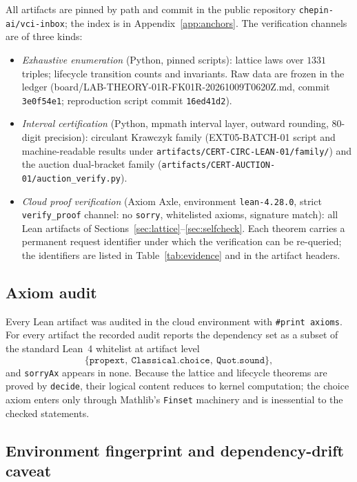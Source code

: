 \documentclass[11pt]{article}
\theoremstyle{definition}
\theoremstyle{remark}
\newcommand{\rid}[1]{\texttt{#1}}
\newcommand{\lean}[1]{\texttt{#1}}
\begin{document}
All artifacts are pinned by path and commit in the public repository
\texttt{chepin-ai/vci-inbox}; the index is in Appendix~\ref{app:anchors}.
The verification channels are of three kinds:
\begin{itemize}
\item \emph{Exhaustive enumeration} (Python, pinned scripts): lattice laws
over $1331$ triples; lifecycle transition counts and invariants. Raw data
are frozen in the ledger (board/LAB-THEORY-01R-FK01R-20261009T0620Z.md,
commit \rid{3e0f54e1}; reproduction script commit \rid{16ed41d2}).
\item \emph{Interval certification} (Python, mpmath interval layer,
outward rounding, 80-digit precision): circulant Krawczyk family
(EXT05-BATCH-01 script and machine-readable results under
\lean{artifacts/CERT-CIRC-LEAN-01/family/}) and the auction dual-bracket
family (\lean{artifacts/CERT-AUCTION-01/auction\_verify.py}).
\item \emph{Cloud proof verification} (Axiom Axle, environment
\texttt{lean-4.28.0}, strict \texttt{verify\_proof} channel: no
\texttt{sorry}, whitelisted axioms, signature match): all Lean artifacts of
Sections~\ref{sec:lattice}--\ref{sec:selfcheck}. Each theorem carries a
permanent request identifier under which the verification can be re-queried;
the identifiers are listed in Table~\ref{tab:evidence} and in the artifact
headers.
\end{itemize}

\subsection{Axiom audit}

Every Lean artifact was audited in the cloud environment with
\texttt{\#print axioms}. For every artifact the recorded audit reports the dependency set as a
subset of the standard Lean~4 whitelist at artifact level
\[
\{\texttt{propext},\ \texttt{Classical.choice},\ \texttt{Quot.sound}\},
\]
and \texttt{sorryAx} appears in none. Because the lattice and lifecycle
theorems are proved by \texttt{decide}, their logical content reduces to
kernel computation; the choice axiom enters only through Mathlib's
\texttt{Finset} machinery and is inessential to the checked statements.

\subsection{Environment fingerprint and dependency-drift caveat}
\end{document}

